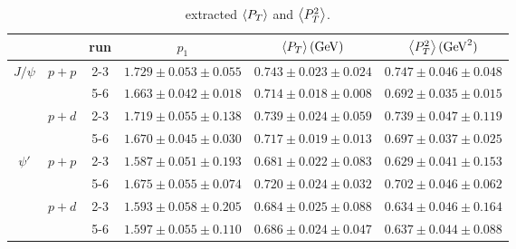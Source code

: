 \documentclass[../main.tex]{subfiles}
\begin{document}
\begin{table}[h!]
	\centering
	\caption{extracted $\expval{P_T}$ and $\expval{P^2_T}$.}
	\label{tab:kaplan_result}
	\begin{tabular}{cc|c|c|c|c}
		\hline
		                                               &                        & run & $p_1$                   & $\expval{P_T} (\unit{\GeV})$          & $\expval{P^2_T} (\unit{\square\GeV})$        \\ \hline
		\multicolumn{1}{c|}{\multirow{4}{*}{$J/\psi$}} & \multirow{2}{*}{$p+p$} & 2-3 & $1.729\pm0.053\pm0.055$ & $0.743\pm0.023\pm0.024$ & $0.747\pm0.046\pm0.048$ \\ \cline{3-6}
		\multicolumn{1}{c|}{}                          &                        & 5-6 & $1.663\pm0.042\pm0.018$ & $0.714\pm0.018\pm0.008$ & $0.692\pm0.035\pm0.015$ \\ \cline{2-6}
		\multicolumn{1}{c|}{}                          & \multirow{2}{*}{$p+d$} & 2-3 & $1.719\pm0.055\pm0.138$ & $0.739\pm0.024\pm0.059$ & $0.739\pm0.047\pm0.119$ \\ \cline{3-6}
		\multicolumn{1}{c|}{}                          &                        & 5-6 & $1.670\pm0.045\pm0.030$ & $0.717\pm0.019\pm0.013$ & $0.697\pm0.037\pm0.025$ \\ \hline
		\multicolumn{1}{c|}{\multirow{4}{*}{$\psi'$}}  & \multirow{2}{*}{$p+p$} & 2-3 & $1.587\pm0.051\pm0.193$ & $0.681\pm0.022\pm0.083$ & $0.629\pm0.041\pm0.153$ \\ \cline{3-6}
		\multicolumn{1}{c|}{}                          &                        & 5-6 & $1.675\pm0.055\pm0.074$ & $0.720\pm0.024\pm0.032$ & $0.702\pm0.046\pm0.062$ \\ \cline{2-6}
		\multicolumn{1}{c|}{}                          & \multirow{2}{*}{$p+d$} & 2-3 & $1.593\pm0.058\pm0.205$ & $0.684\pm0.025\pm0.088$ & $0.634\pm0.046\pm0.164$ \\ \cline{3-6}
		\multicolumn{1}{c|}{}                          &                        & 5-6 & $1.597\pm0.055\pm0.110$ & $0.686\pm0.024\pm0.047$ & $0.637\pm0.044\pm0.088$ \\ \hline
	\end{tabular}
\end{table}
\end{document}
